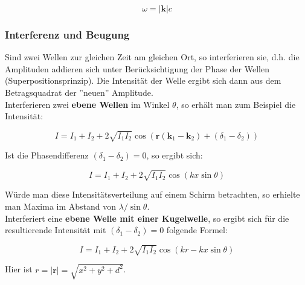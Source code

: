 $$ \omega = |\mathbf k|c$$

\subsubsection{Interferenz und Beugung}

Sind zwei Wellen zur gleichen Zeit am gleichen Ort, so interferieren sie, d.h. die Amplituden addieren sich unter Berücksichtigung der Phase der Wellen (Superpositionsprinzip). Die Intensität der Welle ergibt sich dann aus dem Betragsquadrat der ''neuen'' Amplitude.\\

Interferieren zwei \textbf{ebene Wellen} im Winkel $\theta$, so erhält man zum Beispiel die Intensität:

\begin{equation} I = I_1 + I_2 + 2\sqrt{I_1I_2}\cos{(\mathbf r(\mathbf k_1 - \mathbf k_2) + (\delta_1 - \delta_2))} \end{equation}

Ist die Phasendifferenz $(\delta_1 - \delta_2) = 0$, so ergibt sich:

\begin{equation} I = I_1 + I_2 + 2\sqrt{I_1I_2}\cos(kx\sin\theta) \end{equation}

Würde man diese Intensitätsverteilung auf einem Schirm betrachten, so erhielte man Maxima im Abstand von $\lambda/\sin\theta$.\\

Interferiert eine \textbf{ebene Welle mit einer Kugelwelle}, so ergibt sich für die resultierende Intensität mit $(\delta_1 - \delta_2) = 0$ folgende Formel:

\begin{equation} I = I_1 + I_2 + 2\sqrt{I_1I_2}\cos(kr-kx\sin\theta)  \end{equation}

Hier ist $r = |\mathbf r| = \sqrt{x^2+y^2+d^2}$.


